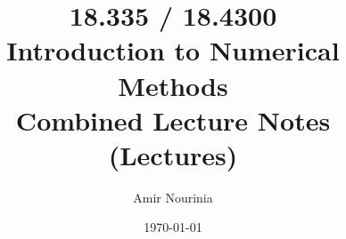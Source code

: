 \documentclass[12pt]{article}
\begin{document}
\title{18.335 / 18.4300 \\ Introduction to Numerical Methods \\
       Combined Lecture Notes (Lectures)}
\author{Amir Nourinia}
\date{\today}
\maketitle

\tableofcontents
\newpage

 
\end{document}
